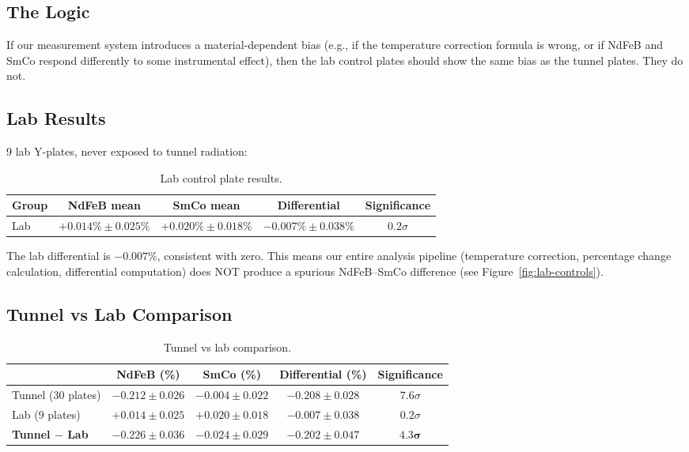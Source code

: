 \documentclass[11pt,letterpaper]{article}
\begin{document}
\subsection{The Logic}

If our measurement system introduces a material-dependent bias (e.g., if the
temperature correction formula is wrong, or if NdFeB and SmCo respond
differently to some instrumental effect), then the lab control plates should show
the same bias as the tunnel plates. They do not.

\subsection{Lab Results}

9 lab Y-plates, never exposed to tunnel radiation:

\begin{table}[htbp]
\centering
\caption{Lab control plate results.}
\label{tab:lab-results}
\begin{tabular}{@{}lcccc@{}}
\toprule
Group & NdFeB mean & SmCo mean & Differential & Significance \\
\midrule
Lab & $+0.014\% \pm 0.025\%$ & $+0.020\% \pm 0.018\%$ & $-0.007\% \pm 0.038\%$ & $0.2\sigma$ \\
\bottomrule
\end{tabular}
\end{table}

The lab differential is $-0.007\%$, consistent with zero. This means our entire
analysis pipeline (temperature correction, percentage change calculation,
differential computation) does NOT produce a spurious NdFeB--SmCo difference
(see Figure~\ref{fig:lab-controls}).

\subsection{Tunnel vs Lab Comparison}

\begin{table}[htbp]
\centering
\caption{Tunnel vs lab comparison.}
\label{tab:tunnel-lab}
\begin{tabular}{@{}lcccc@{}}
\toprule
& NdFeB (\%) & SmCo (\%) & Differential (\%) & Significance \\
\midrule
Tunnel (30 plates) & $-0.212 \pm 0.026$ & $-0.004 \pm 0.022$ & $-0.208 \pm 0.028$ & $7.6\sigma$ \\
Lab (9 plates)     & $+0.014 \pm 0.025$ & $+0.020 \pm 0.018$ & $-0.007 \pm 0.038$ & $0.2\sigma$ \\
\textbf{Tunnel $-$ Lab} & $\boldsymbol{-0.226 \pm 0.036}$ & $\boldsymbol{-0.024 \pm 0.029}$ & $\boldsymbol{-0.202 \pm 0.047}$ & $\boldsymbol{4.3\sigma}$ \\
\bottomrule
\end{tabular}
\end{table}
\end{document}
